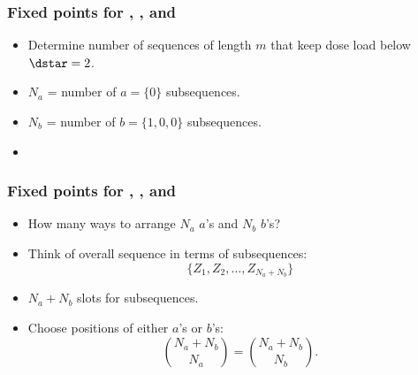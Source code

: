 \begin{frame}
  \frametitle{Fixed points for , , and }

  \begin{itemize}
  \item<1-> Determine number of sequences of length $m$ that
    keep dose load below $\dstar=2$.
  \item<2->
    $N_a$ = number of $a = \{0\}$ subsequences.
  \item<3->
    $N_b$ = number of $b = \{1,0,0\}$ subsequences.
  \item<6->
  \end{itemize}


\end{frame}

\begin{frame}
  \frametitle{Fixed points for , , and }

  \begin{itemize}
  \item<1->
    How many ways to arrange $N_a$ $a$'s and $N_b$ $b$'s?
  \item<2-> 
    Think of overall sequence in terms of subsequences:
    $$ \{Z_1, Z_2, \ldots, Z_{N_a + N_b} \} $$
  \item<3->
    $N_a + N_b$ slots for subsequences.
  \item<4-> 
    Choose positions of either $a$'s or $b$'s:
    $$
    \binom{N_a + N_b}{N_a} = \binom{N_a + N_b}{N_b}.
    $$
  \end{itemize}

\end{frame}

